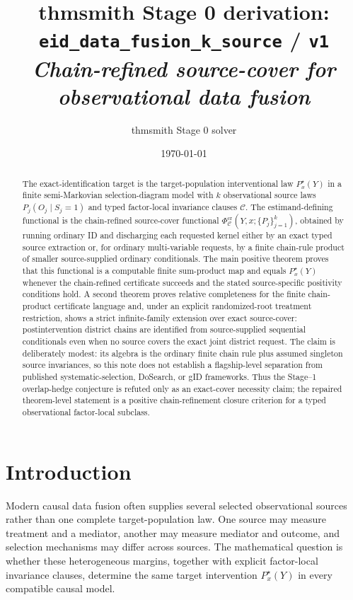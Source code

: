 \documentclass[11pt]{article}
\title{thmsmith Stage 0 derivation: \texttt{eid\_data\_fusion\_k\_source} / \texttt{v1}%
  \\ \large\textit{Chain-refined source-cover for observational data fusion}}
\author{thmsmith Stage 0 solver}
\date{\today}
\theoremstyle{definition}
\theoremstyle{plain}
\theoremstyle{remark}
\begin{document}
\maketitle


\begin{abstract}
The exact-identification target is the target-population interventional law
\(P^\star_x(Y)\) in a finite semi-Markovian selection-diagram model with
\(k\) observational source laws \(P_j(O_j\mid S_j=1)\) and typed
factor-local invariance clauses \(\mathcal C\).  The estimand-defining
functional is the chain-refined source-cover functional
\(\Phi^{\mathrm{cr}}_{\mathcal C}(Y,x;\{P_j\}_{j=1}^k)\), obtained by running
ordinary ID and discharging each requested kernel either by an exact typed
source extraction or, for ordinary multi-variable requests, by a finite
chain-rule product of smaller source-supplied ordinary conditionals.  The main
positive theorem proves that this functional is a computable finite
sum-product map and equals \(P^\star_x(Y)\) whenever the chain-refined
certificate succeeds and the stated source-specific positivity conditions
hold.  A second theorem proves relative completeness for the finite
chain-product certificate language and, under an explicit randomized-root
treatment restriction, shows a strict infinite-family extension over exact
source-cover: postintervention district chains are identified from
source-supplied sequential conditionals even when no source covers the exact
joint district request.  The claim is deliberately modest: its algebra is the
ordinary finite chain rule plus assumed singleton source invariances, so this
note does not establish a flagship-level separation from published
systematic-selection, DoSearch, or gID frameworks.  Thus the Stage--1
overlap-hedge conjecture is refuted only as an exact-cover necessity claim;
the repaired theorem-level statement is a positive chain-refinement closure
criterion for a typed observational factor-local subclass.
\end{abstract}

\section{Introduction}
Modern causal data fusion often supplies several selected observational
sources rather than one complete target-population law.  One source may
measure treatment and a mediator, another may measure mediator and outcome,
and selection mechanisms may differ across sources.  The mathematical
question is whether these heterogeneous margins, together with explicit
factor-local invariance clauses, determine the same target intervention
\(P^\star_x(Y)\) in every compatible causal model.
\end{document}
